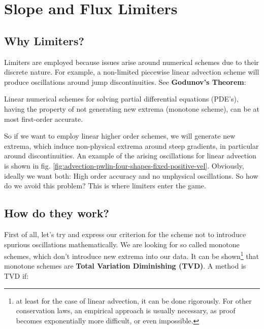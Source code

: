 \newpage



\section{Slope and Flux Limiters}\label{chap:limiters}



\subsection{Why Limiters?}

Limiters are employed because issues arise around numerical schemes due to their discrete nature.
For example, a non-limited piecewise linear advection scheme will produce oscillations around jump discontinuities.
See \textbf{Godunov's Theorem}:



\begin{displayquote}
	Linear numerical schemes for solving partial differential equations (PDE's), having the property of not generating new extrema (monotone scheme), can be at most first-order accurate.
\end{displayquote}


So if we want to employ linear higher order schemes, we will generate new extrema, which induce non-physical extrema around steep gradients, in particular around discontinuities.
An example of the arising oscillations for linear advection is shown in fig. \ref{fig:advection-pwlin-four-shapes-fixed-positive-vel}.
Obviously, ideally we want both: High order accuracy and no unphysical oscillations.
So how do we avoid this problem?
This is where limiters enter the game.









\subsection{How do they work?}


First of all, let's try and express our criterion for the scheme not to introduce spurious oscillations mathematically.
We are looking for so called monotone schemes, which don't introduce new extrema into our data.
It can be shown\footnote{
	at least for the case of linear advection, it can be done rigorously. 
	For other conservation laws, an empirical approach is usually necessary, as proof becomes exponentially more difficult, or even impossible.
}
that monotone schemes are \textbf{Total Variation Diminishing (TVD)}.
A method is TVD if:

